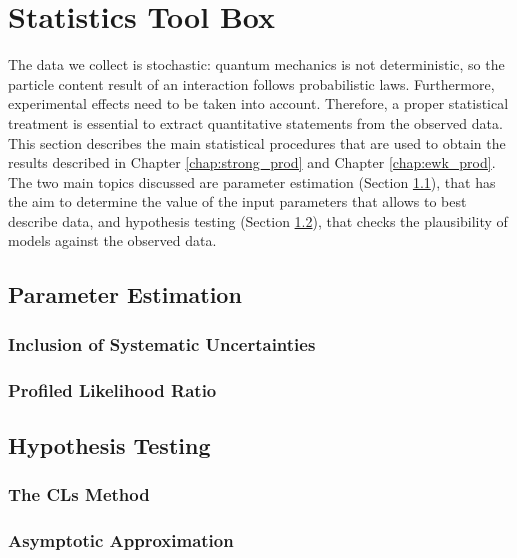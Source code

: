 \chapter{Statistics Tool Box}
\label{chap:stat}

The data we collect is stochastic: quantum mechanics is not deterministic, so the particle content result of an interaction follows probabilistic laws. Furthermore, experimental effects need to be taken into account. Therefore, a proper statistical treatment is essential to extract quantitative statements from the observed data. This section describes the main statistical procedures that are used to obtain the results described in Chapter \ref{chap:strong_prod} and Chapter \ref{chap:ewk_prod}. The two main topics discussed are parameter estimation (Section \ref{sec:stat:pe}), that has the aim to determine the value of the input parameters that allows to best describe data, and hypothesis testing (Section \ref{sec:stat:ht}), that checks the plausibility of models against the observed data.

\section{Parameter Estimation}

\label{sec:stat:pe}



\subsection{Inclusion of Systematic Uncertainties}

\subsection{Profiled Likelihood Ratio}

\section{Hypothesis Testing}
\label{sec:stat:ht}


\subsection{The CLs Method}

\subsection{Asymptotic Approximation}


